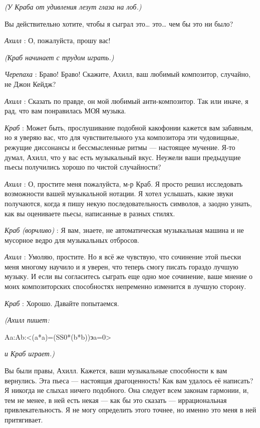 \documentclass[../main.tex]{subfiles}
\begin{document}
\begin{dialogue}
\emph{(У Краба от удивления лезут глаза на лоб.)}

Вы действительно хотите, чтобы я сыграл это\ldots{} это\ldots{} чем бы это ни было?

\emph{Ахилл} : О, пожалуйста, прошу вас!

\emph{(Краб начинает с трудом играть.)}

\emph{Черепаха} : Браво! Браво! Скажите, Ахилл, ваш любимый композитор, случайно, не Джон Кейдж?

\emph{Ахилл} : Сказать по правде, он мой любимый анти-композитор. Так или иначе, я рад, что вам понравилась МОЯ музыка.

\emph{Краб} : Может быть, прослушивание подобной какофонии кажется вам забавным, но я уверяю вас, что для чувствительного уха композитора эти чудовищные, режущие диссонансы и бессмысленные ритмы --- настоящее мучение. Я-то думал, Ахилл, что у вас есть музыкальный вкус. Неужели ваши предыдущие пьесы получились хорошо по чистой случайности?

\emph{Ахилл} : О, простите меня пожалуйста, м-р Краб. Я просто решил исследовать возможности вашей музыкальной нотации. Я хотел услышать, какие звуки получаются, когда я пишу некую последовательность символов, а заодно узнать, как вы оцениваете пьесы, написанные в разных стилях.

\emph{Краб (ворчливо)} : Я вам, знаете, не автоматическая музыкальная машина и не мусорное ведро для музыкальных отбросов.

\emph{Ахилл} : Умоляю, простите. Но я всё же чувствую, что сочинение этой пьески меня многому научило и я уверен, что теперь смогу писать гораздо лучшую музыку. И если вы согласитесь сыграть еще одно мое сочинение, ваше мнение о моих композиторских способностях непременно изменится в лучшую сторону.

\emph{Краб} : Хорошо. Давайте попытаемся.

\emph{(Ахилл пишет:}

Aa:Ab:\textless(a*a)=(SS0*(b*b))эa=0\textgreater{}

\emph{и Краб играет.)}

Вы были правы, Ахилл. Кажется, ваши музыкальные способности к вам вернулись. Эта пьеса --- настоящая драгоценность! Как вам удалось её написать? Я никогда не слыхал ничего подобного. Она следует всем законам гармонии, и, тем не менее, в ней есть некая --- как бы это сказать --- иррациональная привлекательность. Я не могу определить этого точнее, но именно это меня в ней притягивает.


\end{dialogue}
\end{document}

